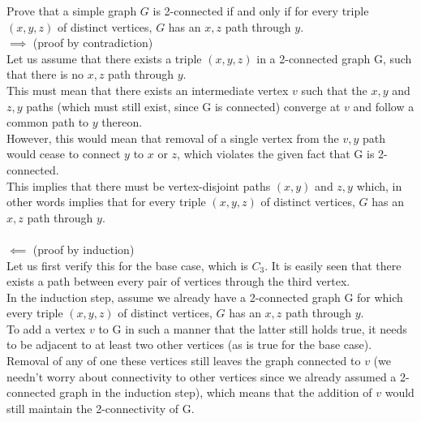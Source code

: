 \documentclass[12pt]{article}
\newenvironment{question}[2][Question]{\begin{trivlist}
\item[\hskip \labelsep {\bfseries #1}\hskip \labelsep {\bfseries #2.}]}{\end{trivlist}}
\begin{document}
\begin{question}{7}
Prove that a simple graph $G$ is 2-connected if and only if for every triple $(x, y, z)$ of distinct vertices, $G$ has an $x, z$ path through $y$. \\

\noindent
$\implies$ (proof by contradiction)\\
Let us assume that there exists a triple $(x, y, z)$ in a 2-connected graph G, such that there is no $x, z$ path through $y$.\\
This must mean that there exists an intermediate vertex $v$ such that the $x, y$ and $z, y$ paths (which must still exist, since G is connected) converge at $v$  and follow a common path to $y$ thereon.\\
However, this would mean that removal of a single vertex from the $v, y$ path would cease to connect $y$ to $x$ or $z$, which violates the given fact that G is 2-connected.\\
This implies that there must be vertex-disjoint paths $(x, y)$ and $z, y$ which, in other words implies that for every triple $(x, y, z)$ of distinct vertices, $G$ has an $x, z$ path through $y$.\\
\\
$\impliedby$ (proof by induction)\\
Let us first verify this for the base case, which is $C_3$. It is easily seen that there exists a path between every pair of vertices through the third vertex.\\
In the induction step, assume we already have a 2-connected graph G for which every triple $(x, y, z)$ of distinct vertices, $G$ has an $x, z$ path through $y$.\\
To add a vertex $v$ to G in such a manner that the latter still holds true, it needs to be adjacent to at least two other vertices (as is true for the base case).\\
Removal of any of one these vertices still leaves the graph connected to $v$ (we needn't worry about connectivity to other vertices since we already assumed a 2-connected graph in the induction step), which means that the addition of $v$ would still maintain the 2-connectivity of G.
\end{question}
\end{document}
